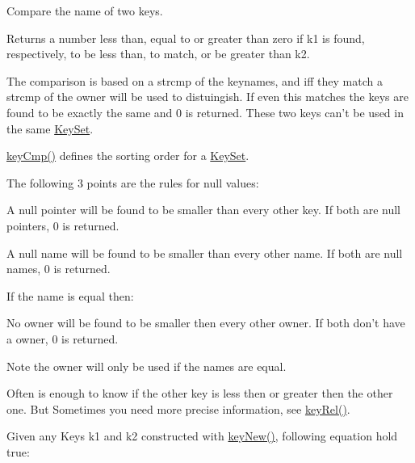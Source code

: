 Compare the name of two keys.

\begin{DoxyReturn}{Returns}
a number less than, equal to or greater than zero if k1 is found, respectively, to be less than, to match, or be greater than k2.
\end{DoxyReturn}
The comparison is based on a strcmp of the keynames, and iff they match a strcmp of the owner will be used to distuingish. If even this matches the keys are found to be exactly the same and 0 is returned. These two keys can't be used in the same \hyperlink{classkdb_1_1KeySet}{Key\-Set}.

\hyperlink{group__keytest_gaf6e66e12fe04d535a5d1c8218ced803e}{key\-Cmp()} defines the sorting order for a \hyperlink{classkdb_1_1KeySet}{Key\-Set}.

The following 3 points are the rules for null values\-:


\begin{DoxyItemize}
\item A null pointer will be found to be smaller than every other key. If both are null pointers, 0 is returned.
\end{DoxyItemize}


\begin{DoxyItemize}
\item A null name will be found to be smaller than every other name. If both are null names, 0 is returned.
\end{DoxyItemize}

If the name is equal then\-:


\begin{DoxyItemize}
\item No owner will be found to be smaller then every other owner. If both don't have a owner, 0 is returned.
\end{DoxyItemize}

\begin{DoxyNote}{Note}
the owner will only be used if the names are equal.
\end{DoxyNote}
Often is enough to know if the other key is less then or greater then the other one. But Sometimes you need more precise information, see \hyperlink{group__keytest_ga6bb0f95ac34ce9c42d61bb35a76139d0}{key\-Rel()}.

Given any Keys k1 and k2 constructed with \hyperlink{group__key_gad23c65b44bf48d773759e1f9a4d43b89}{key\-New()}, following equation hold true\-:


